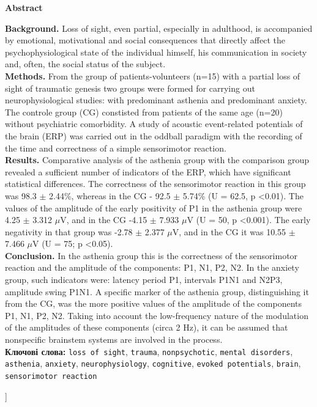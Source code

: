 \documentclass[twocolumn]{article}
\begin{document}
\begin{@twocolumnfalse}
\maketitle
\begin{center}
{\Large \textbf{Abstract}} \vspace{1ex}\\
\end{center}
\textbf{Background. }Loss of sight, even partial, especially in adulthood, is accompanied by emotional, motivational and social consequences that directly affect the psychophysiological state of the individual himself, his communication in society and, often, the social status of the subject. \vspace{1ex}\\
\textbf{Methods. }From the group of patients-volunteers (n=15) with a partial loss of sight of traumatic genesis two groups were formed for carrying out neurophysiological studies: with predominant asthenia and predominant anxiety. The controle group (CG) constisted from patients of the same age (n=20) without psychiatric comorbidity. A study of acoustic event-related potentials of the brain (ERP) was carried out in the oddball paradigm with the recording of the time and correctness of a simple sensorimotor reaction. \vspace{1ex}\\
\textbf{Results. }Comparative analysis of the asthenia group with the comparison group revealed a sufficient number of indicators of the ERP, which have significant statistical differences. The correctness of the sensorimotor reaction in this group was 98.3 $\pm$ 2.44\%, whereas in the CG - 92.5 $\pm$ 5.74\% (U = 62.5, p \textless{}0.01). The values of the amplitude of the early positivity of P1 in the asthenia group were 4.25 $\pm$ 3.312 $\mu$V, and in the CG -4.15 $\pm$ 7.933 $\mu$V (U = 50, p \textless{}0.001). The early negativity in that group was -2.78 $\pm$ 2.377 $\mu$V, and in the CG it was 10.55 $\pm$ 7.466 $\mu$V (U = 75; p \textless{}0.05). \vspace{1ex}\\
\textbf{Conclusion. }In the asthenia group this is the correctness of the sensorimotor reaction and the amplitude of the components: P1, N1, P2, N2. In the anxiety group, such indicators were: latency period P1, intervals P1N1 and N2P3, amplitude swing P1N1. A specific marker of the asthenia group, distinguishing it from the CG, was the more positive values of the amplitude of the components P1, N1, P2, N2. Taking into account the low-frequency nature of the modulation of the amplitudes of these components (circa 2 Hz), it can be assumed that nonspecific brainstem systems are involved in the process. \vspace{1ex}\\
{\textbf{Ключові слова:}} \texttt{loss of sight}, 
\texttt{trauma}, 
\texttt{nonpsychotic}, 
\texttt{mental disorders}, 
\texttt{asthenia}, 
\texttt{anxiety}, 
\texttt{neurophysiology}, 
\texttt{cognitive}, 
\texttt{evoked potentials}, 
\texttt{brain}, 
\texttt{sensorimotor reaction}\vspace{5ex}
\end{@twocolumnfalse}]
\end{document}
